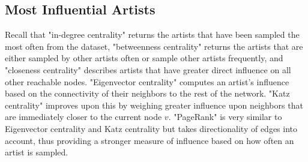 \documentclass[pageno]{jpaper}
\begin{document}
\subsection{Most Influential Artists}
Recall that "in-degree centrality" returns the artists that have been sampled the most often from the dataset, "betweenness centrality" returns the artists that are either sampled by other artists often or sample other artists frequently, and "closeness centrality" describes artists that have greater direct influence on all other reachable nodes. "Eigenvector centrality" computes an artist's influence based on the connectivity of their neighbors to the rest of the network. "Katz centrality" improves upon this by weighing greater influence upon neighbors that are immediately closer to the current node $v$. "PageRank" is very similar to Eigenvector centrality and Katz centrality but takes directionality of edges into account, thus providing a stronger measure of influence based on how often an artist is sampled.
\end{document}
